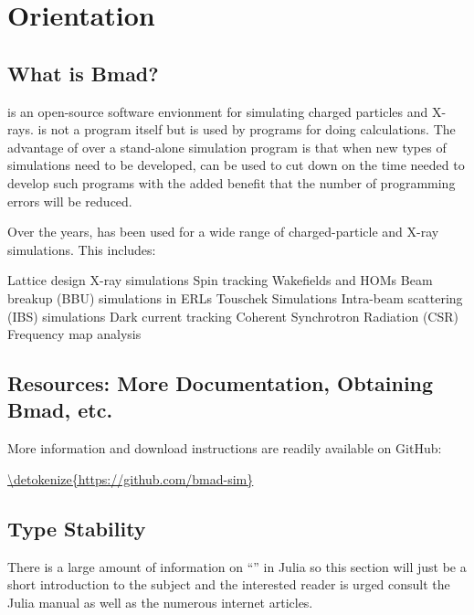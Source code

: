 \chapter{Orientation}
\label{c:orient}

\section{What is Bmad?}

\bmad is an open-source software envionment for simulating charged particles and
X-rays. \bmad is not a program itself but is used by programs for doing calculations. The advantage
of \bmad over a stand-alone simulation program is that when new types of simulations need to be
developed, \bmad can be used to cut down on the time needed to develop such programs with the added
benefit that the number of programming errors will be reduced.

Over the years, \bmad has been used for a wide range of charged-particle and X-ray simulations. This
includes:
\begin{example}
Lattice design                                  X-ray simulations
Spin tracking                                   Wakefields and HOMs
Beam breakup (BBU) simulations in ERLs          Touschek Simulations
Intra-beam scattering (IBS) simulations         Dark current tracking
Coherent Synchrotron Radiation (CSR)            Frequency map analysis
\end{example}

\section{Resources: More Documentation, Obtaining Bmad, etc.}
\label{s:bmad.web}

More information and download instructions are readily available on GitHub:
\begin{example}
  \url{\detokenize{https://github.com/bmad-sim}}
\end{example}

\section{Type Stability}
\label{s:type.stable}

There is a large amount of information on ``'' in Julia so this section will just 
be a short introduction to the subject and the interested reader is urged consult the Julia manual 
as well as the numerous internet articles.

